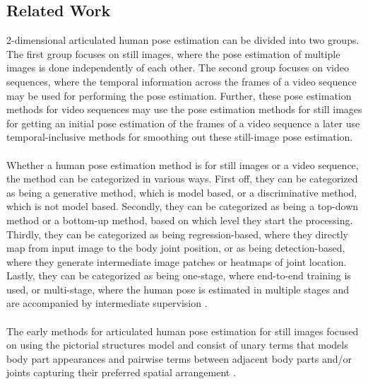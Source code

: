 \documentclass[./main.tex]{subfiles}
\begin{document}
\subsection{Related Work}
\label{subsec:related_work}
2-dimensional articulated human pose estimation can be divided into two groups. The first group focuses on still images, where the pose estimation of multiple images is done independently of each other. The second group focuses on video sequences, where the temporal information across the frames of a video sequence may be used for performing the pose estimation. Further, these pose estimation methods for video sequences may use the pose estimation methods for still images for getting an initial pose estimation of the frames of a video sequence a later use temporal-inclusive methods for smoothing out these still-image pose estimation.
\\
\\
Whether a human pose estimation method is for still images or a video sequence, the method can be categorized in various ways. First off, they can be categorized as being a generative method, which is model based, or a discriminative method, which is not model based. Secondly, they can be categorized as being a top-down method or a bottom-up method, based on which level they start the processing. Thirdly, they can be categorized as being regression-based, where they directly map from input image to the body joint position, or as being detection-based, where they generate intermediate image patches or heatmaps of joint location. Lastly, they can be categorized as being one-stage, where end-to-end training is used, or multi-stage, where the human pose is estimated in multiple stages and are accompanied by intermediate supervision \cite{Chen_2020}.
\\
\\
The early methods for articulated human pose estimation for still images focused on using the pictorial structures model \cite{fischler1973representation} and consist of unary terms that models body part appearances and pairwise terms between adjacent body parts and/or joints capturing their preferred spatial arrangement \cite{Pishchulin_2013_CVPR, andriluka2012discriminative, johnson2011learning, yang2011articulated}.
\\
\\
\end{document}
